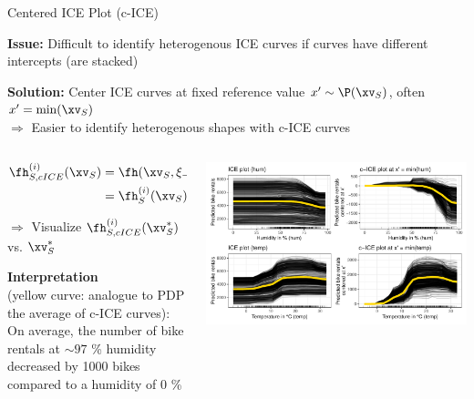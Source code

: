 \documentclass[11pt,compress,t,notes=noshow, aspectratio=169, xcolor=table]{beamer}
\begin{document}
\begin{frame}{Centered ICE Plot (c-ICE) }

\textbf{Issue:} Difficult to identify heterogenous ICE curves if curves have different intercepts (are stacked)

\textbf{Solution:} Center ICE curves at fixed reference value $x' \sim \P(\xv_S)$, often $x' = \min(\xv_S)$\\
$\Rightarrow$ Easier to identify heterogenous shapes with c-ICE curves
\vspace{-0.2cm}
\begin{columns}[c]
\begin{column}{0.45\textwidth}
$$\begin{aligned}
\fh_{S, cICE}^{(i)}(\xv_S)
&= \fh(\xv_S, \xi_{-S}) - \fh(x', \xi_{-S}) \\
&= \fh_{S}^{(i)}(\xv_S) - \fh_{S}^{(i)}(x')
\end{aligned}$$

$\Rightarrow$ Visualize $\fh_{S, cICE}^{(i)}(\xv_S^*)$ vs. $\xv_S^*$

\lz
\pause
\textbf{Interpretation} \\
(yellow curve: analogue to PDP the average of c-ICE curves): \\
On average, the number of bike rentals at $\sim 97$ \% humidity decreased by 1000 bikes compared to a humidity of 0 \%
\end{column}
\begin{column}{0.54\textwidth}
\begin{center}
\includegraphics[width=\textwidth]{figure/cICE}
\end{center}
\end{column}
\end{columns}


\end{frame}
\end{document}
